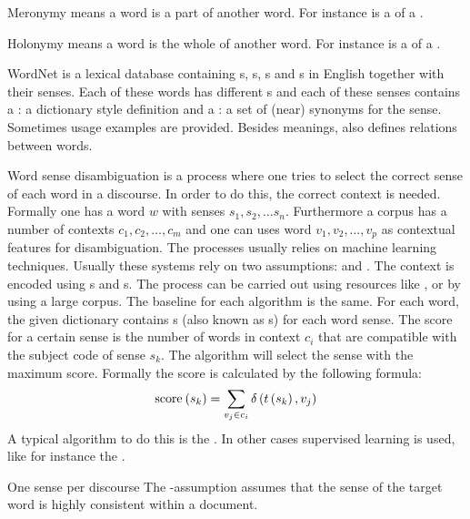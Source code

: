 \begin{df}{Meronymy}
\sb{} means a word is a part of another word. For instance  is a  of a .
\end{df}
\begin{df}{Holonymy}
\sb{} means a word is the whole of another word. For instance  is a  of a .
\end{df}
\begin{df}{WordNet}
\sb{} is a lexical database containing s, s, s and s in English together with their senses. Each of these words has different s and each of these senses contains a : a dictionary style definition and a : a set of (near) synonyms for the sense. Sometimes usage examples are provided. Besides meanings, \sb{} also defines relations between words.
\end{df}
\begin{df}{Word sense disambiguation}
\sb{} is a process where one tries to select the correct sense of each word in a discourse. In order to do this, the correct context is needed. Formally one has a word $w$ with senses $s_1,s_2,\ldots s_n$. Furthermore a corpus has a number of contexts $c_1,c_2,\ldots,c_m$ and one can uses word $v_1,v_2,\ldots,v_p$ as contextual features for disambiguation. The processes usually relies on machine learning techniques. Usually these systems rely on two assumptions:  and . The context is encoded using s and s. The process can be carried out using resources like , or by using a large corpus. The baseline for each \sb{} algorithm is the same. For each word, the given dictionary contains s (also known as s) for each word sense. The score for a certain sense is the number of words in context $c_i$ that are compatible with the subject code of sense $s_k$. The algorithm will select the sense with the maximum score. Formally the score is calculated by the following formula:
\begin{equation}
\mbox{score}_{}\left(s_k\right)=\displaystyle\sum_{v_j\in c_i}\delta\left(t\left(s_k\right),v_j\right)
\end{equation}
A typical algorithm to do this is the . In other cases supervised learning is used, like for instance the .
\end{df}
\begin{tm}{One sense per discourse}
The \sb{}-assumption assumes that the sense of the target word is highly consistent within a document.
\end{tm}
